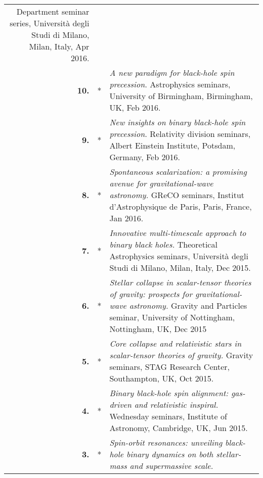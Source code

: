 \documentclass[11pt,letterpaper,sans]{moderncv}   %
\begin{document}
{\begin{longtable}{rp{0.4cm}p{15.8cm}}
\newline{} 
Department seminar series, Università degli Studi di Milano, Milan, Italy, Apr 2016.
\vspace{0.05cm}\\
\textbf{10.} & *& \textit{A new paradigm for black-hole spin precession.}
\newline{} 
Astrophysics seminars, University of Birmingham, Birmingham, UK, Feb 2016.
\vspace{0.05cm}\\
\textbf{9.} & *& \textit{New insights on binary black-hole spin precession.}
\newline{} 
Relativity division seminars, Albert Einstein Institute, Potsdam, Germany, Feb 2016.
\vspace{0.05cm}\\
\textbf{8.} & *& \textit{Spontaneous scalarization: a promising avenue for gravitational-wave astronomy.}
\newline{} 
GReCO seminars, Institut d'Astrophysique de Paris, Paris, France, Jan 2016.
\vspace{0.05cm}\\
\textbf{7.} & *& \textit{Innovative multi-timescale approach to binary black holes.}
\newline{} 
Theoretical Astrophysics seminars, Università degli Studi di Milano, Milan, Italy, Dec 2015.
\vspace{0.05cm}\\
\textbf{6.} & *& \textit{Stellar collapse in scalar-tensor theories of gravity: prospects for gravitational-wave astronomy.}
\newline{} 
Gravity and Particles seminar, University of Nottingham, Nottingham, UK, Dec 2015
\vspace{0.05cm}\\
\textbf{5.} & *& \textit{Core collapse and relativistic stars in scalar-tensor theories of gravity.}
\newline{} 
Gravity seminars, STAG Research Center, Southampton, UK, Oct 2015.
\vspace{0.05cm}\\
\textbf{4.} & *& \textit{Binary black-hole spin alignment: gas-driven and relativistic inspiral.}
\newline{} 
Wednesday seminars, Institute of Astronomy, Cambridge, UK, Jun 2015.\vspace{0.05cm}\\
\textbf{3.} & *& \textit{Spin-orbit resonances: unveiling black-hole binary dynamics on both stellar-mass and supermassive scale.}

\end{longtable}}
\end{document}
